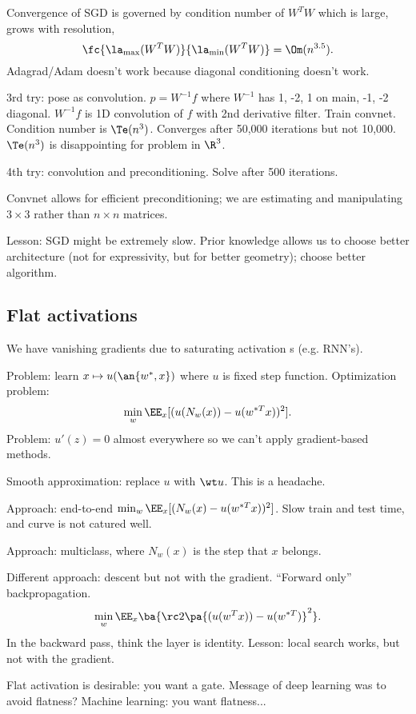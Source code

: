 Convergence of SGD is governed by condition number of $W^TW$ which is large, grows with resolution, 
$$
\fc{\la_{\max}(W^TW)}{\la_{\min}(W^TW)} = \Om(n^{3.5}).
$$
Adagrad/Adam doesn't work because diagonal conditioning doesn't work.

3rd try: pose as convolution. $p=W^{-1}f$ where $W^{-1}$ has 1, -2, 1 on main, -1, -2 diagonal. $W^{-1}f$ is 1D convolution of $f$ with 2nd derivative filter. Train convnet. Condition number is $\Te(n^3)$. Converges after 50,000 iterations but not 10,000. $\Te(n^3)$ is disappointing for problem in $\R^3$.

4th try: convolution and preconditioning. %
Solve after 500 iterations. 

Convnet allows for efficient preconditioning; we are estimating and manipulating $3\times 3$ rather than $n\times n$ matrices.

Lesson: SGD might be extremely slow. Prior knowledge allows us to choose better architecture (not for expressivity, but for better geometry); choose better algorithm.


\subsection{Flat activations}

We have vanishing gradients due to saturating activation s (e.g. RNN's).

Problem: learn $x\mapsto u(\an{w^*,x})$ where $u$ is fixed step function. Optimization problem:
$$
\min_w \EE_x[(u(N_w(x))-u(w^{*T}x))^2].
$$
Problem: $u'(z)=0$ almost everywhere so we can't apply gradient-based methods.

Smooth approximation: replace $u$ with $\wt u$. %
This is a headache.

Approach: end-to-end $\min_w \EE_x[(N_w(x) - u(w^{*T}x))^2]$. Slow train and test time, and curve is not catured well.

Approach: multiclass, where $N_w(x)$ is the step that $x$ belongs.

Different approach: descent but not with the gradient. ``Forward only'' backpropagation. 
$$
\min_w \EE_x\ba{\rc 2 \pa{(u(w^Tx))-u(w^{*T})}^2}.
$$
In the backward pass, think the layer is identity.
Lesson: local search works, but not with the gradient.

Flat activation is desirable: you want a gate.
Message of deep learning was to avoid flatness? 
Machine learning: you want flatness...

